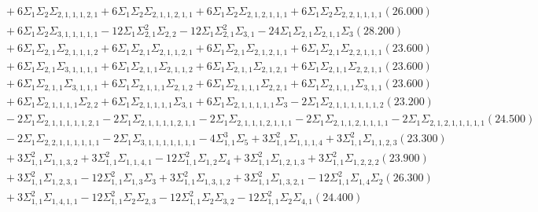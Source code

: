 \documentclass[12pt]{article}
\begin{document}
\begin{landscape}
\begin{align*}
		&\quad\quad +6\Sigma_{1}\Sigma_{2}\Sigma_{2,1,1,1,2,1}+6\Sigma_{1}\Sigma_{2}\Sigma_{2,1,1,2,1,1}+6\Sigma_{1}\Sigma_{2}\Sigma_{2,1,2,1,1,1}+6\Sigma_{1}\Sigma_{2}\Sigma_{2,2,1,1,1,1}(26.000) \\ 
		&\quad\quad +6\Sigma_{1}\Sigma_{2}\Sigma_{3,1,1,1,1,1}-12\Sigma_{1}\Sigma_{2,1}^{2}\Sigma_{2,2}-12\Sigma_{1}\Sigma_{2,1}^{2}\Sigma_{3,1}-24\Sigma_{1}\Sigma_{2,1}\Sigma_{2,1,1}\Sigma_{3}(28.200) \\ 
		&\quad\quad +6\Sigma_{1}\Sigma_{2,1}\Sigma_{2,1,1,1,2}+6\Sigma_{1}\Sigma_{2,1}\Sigma_{2,1,1,2,1}+6\Sigma_{1}\Sigma_{2,1}\Sigma_{2,1,2,1,1}+6\Sigma_{1}\Sigma_{2,1}\Sigma_{2,2,1,1,1}(23.600) \\ 
		&\quad\quad +6\Sigma_{1}\Sigma_{2,1}\Sigma_{3,1,1,1,1}+6\Sigma_{1}\Sigma_{2,1,1}\Sigma_{2,1,1,2}+6\Sigma_{1}\Sigma_{2,1,1}\Sigma_{2,1,2,1}+6\Sigma_{1}\Sigma_{2,1,1}\Sigma_{2,2,1,1}(23.600) \\ 
		&\quad\quad +6\Sigma_{1}\Sigma_{2,1,1}\Sigma_{3,1,1,1}+6\Sigma_{1}\Sigma_{2,1,1,1}\Sigma_{2,1,2}+6\Sigma_{1}\Sigma_{2,1,1,1}\Sigma_{2,2,1}+6\Sigma_{1}\Sigma_{2,1,1,1}\Sigma_{3,1,1}(23.600) \\ 
		&\quad\quad +6\Sigma_{1}\Sigma_{2,1,1,1,1}\Sigma_{2,2}+6\Sigma_{1}\Sigma_{2,1,1,1,1}\Sigma_{3,1}+6\Sigma_{1}\Sigma_{2,1,1,1,1,1}\Sigma_{3}-2\Sigma_{1}\Sigma_{2,1,1,1,1,1,1,2}(23.200) \\ 
		&\quad\quad -2\Sigma_{1}\Sigma_{2,1,1,1,1,1,2,1}-2\Sigma_{1}\Sigma_{2,1,1,1,1,2,1,1}-2\Sigma_{1}\Sigma_{2,1,1,1,2,1,1,1}-2\Sigma_{1}\Sigma_{2,1,1,2,1,1,1,1}-2\Sigma_{1}\Sigma_{2,1,2,1,1,1,1,1}(24.500) \\ 
		&\quad\quad -2\Sigma_{1}\Sigma_{2,2,1,1,1,1,1,1}-2\Sigma_{1}\Sigma_{3,1,1,1,1,1,1,1}-4\Sigma_{1,1}^{3}\Sigma_{5}+3\Sigma_{1,1}^{2}\Sigma_{1,1,1,4}+3\Sigma_{1,1}^{2}\Sigma_{1,1,2,3}(23.300) \\ 
		&\quad\quad +3\Sigma_{1,1}^{2}\Sigma_{1,1,3,2}+3\Sigma_{1,1}^{2}\Sigma_{1,1,4,1}-12\Sigma_{1,1}^{2}\Sigma_{1,2}\Sigma_{4}+3\Sigma_{1,1}^{2}\Sigma_{1,2,1,3}+3\Sigma_{1,1}^{2}\Sigma_{1,2,2,2}(23.900) \\ 
		&\quad\quad +3\Sigma_{1,1}^{2}\Sigma_{1,2,3,1}-12\Sigma_{1,1}^{2}\Sigma_{1,3}\Sigma_{3}+3\Sigma_{1,1}^{2}\Sigma_{1,3,1,2}+3\Sigma_{1,1}^{2}\Sigma_{1,3,2,1}-12\Sigma_{1,1}^{2}\Sigma_{1,4}\Sigma_{2}(26.300) \\ 
		&\quad\quad +3\Sigma_{1,1}^{2}\Sigma_{1,4,1,1}-12\Sigma_{1,1}^{2}\Sigma_{2}\Sigma_{2,3}-12\Sigma_{1,1}^{2}\Sigma_{2}\Sigma_{3,2}-12\Sigma_{1,1}^{2}\Sigma_{2}\Sigma_{4,1}(24.400) \\ 

\end{align*}
\end{landscape}
\end{document}
